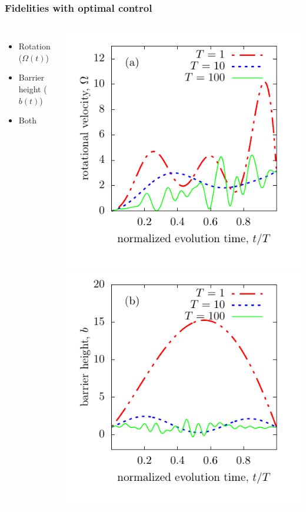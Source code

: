 \documentclass{beamer}
\begin{document}
\begin{frame}
\frametitle{Fidelities with optimal control}
\begin{columns}
\begin{itemize}
\item Rotation ($\Omega(t)$)
\item Barrier height ($b(t)$)
\item Both
\end{itemize}
\includegraphics[width=.49\textwidth]{../data/1d/figR0.pdf}
\includegraphics[width=.49\textwidth]{../data/1d/figB0.pdf}

\end{columns}


\end{frame}
\end{document}
